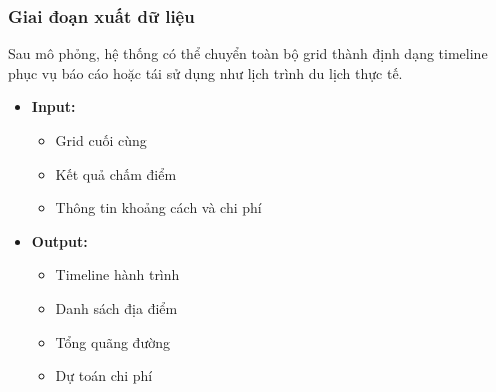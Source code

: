 


\subsubsection{Giai đoạn xuất dữ liệu}

Sau mô phỏng, hệ thống có thể chuyển toàn bộ grid thành định dạng timeline phục vụ báo cáo hoặc tái sử dụng như lịch trình du lịch thực tế.

\begin{itemize}[topsep=0pt, itemsep=2.5pt, leftmargin=1.5cm]
    \item \textbf{Input:}
    \begin{itemize}[topsep=0pt, itemsep=2pt]
        \item Grid cuối cùng
        \item Kết quả chấm điểm
        \item Thông tin khoảng cách và chi phí
    \end{itemize}

    \item \textbf{Output:}
    \begin{itemize}[topsep=0pt, itemsep=2pt]
        \item Timeline hành trình
        \item Danh sách địa điểm
        \item Tổng quãng đường
        \item Dự toán chi phí
    \end{itemize}
\end{itemize}

